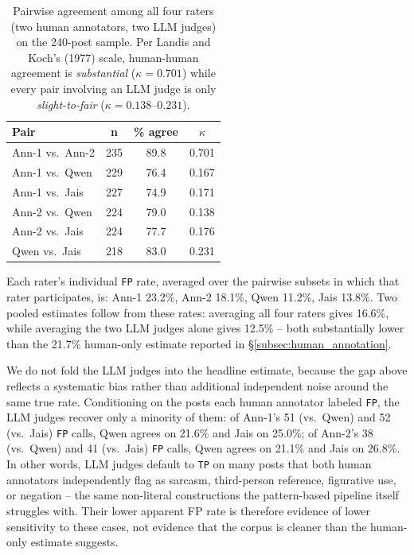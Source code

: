 \documentclass[11pt]{article}
\begin{document}
\begin{table}[h]
\centering
\small
\begin{tabular}{lccc}
\toprule
\textbf{Pair} & \textbf{n} & \textbf{\% agree} & \textbf{$\kappa$} \\
\midrule
Ann-1 vs.\ Ann-2 & 235 & 89.8 & 0.701 \\
Ann-1 vs.\ Qwen & 229 & 76.4 & 0.167 \\
Ann-1 vs.\ Jais & 227 & 74.9 & 0.171 \\
Ann-2 vs.\ Qwen & 224 & 79.0 & 0.138 \\
Ann-2 vs.\ Jais & 224 & 77.7 & 0.176 \\
Qwen vs.\ Jais & 218 & 83.0 & 0.231 \\
\bottomrule
\end{tabular}
\caption{Pairwise agreement among all four raters (two human
annotators, two LLM judges) on the 240-post sample. Per Landis and
Koch's (1977) scale, human-human agreement is \emph{substantial}
($\kappa=0.701$) while every pair involving an LLM judge is only
\emph{slight-to-fair} ($\kappa = 0.138$--$0.231$).}
\label{tab:iaa_full}
\end{table}

Each rater's individual \texttt{FP} rate, averaged over the pairwise
subsets in which that rater participates, is: Ann-1 23.2\%, Ann-2 18.1\%,
Qwen 11.2\%, Jais 13.8\%. Two pooled estimates follow from these rates:
averaging all four raters gives 16.6\%, while averaging the two LLM
judges alone gives 12.5\% -- both substantially lower than the
21.7\% human-only estimate reported in
\S\ref{subsec:human_annotation}.

We do not fold the LLM judges into the headline estimate, because the
gap above reflects a systematic bias rather than additional independent
noise around the same true rate. Conditioning on the posts each human
annotator labeled \texttt{FP}, the LLM judges recover only a minority
of them: of Ann-1's 51 (vs.\ Qwen) and 52 (vs.\ Jais) \texttt{FP} calls,
Qwen agrees on 21.6\% and Jais on 25.0\%; of Ann-2's 38 (vs.\ Qwen) and
41 (vs.\ Jais) \texttt{FP} calls, Qwen agrees on 21.1\% and Jais on
26.8\%. In other words, LLM judges default to \texttt{TP} on many posts
that both human annotators independently flag as sarcasm, third-person
reference, figurative use, or negation -- the same non-literal
constructions the pattern-based pipeline itself struggles with. Their
lower apparent FP rate is therefore evidence of lower sensitivity to
these cases, not evidence that the corpus is cleaner than the
human-only estimate suggests.
\end{document}
